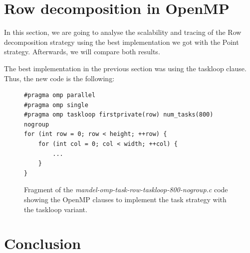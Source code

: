 \documentclass[12pt, a4paper]{article}
\begin{document}
\section{Row decomposition in OpenMP}

In this section, we are going to analyse the scalability and tracing of the Row decomposition strategy using the best implementation we got with the Point strategy. Afterwards, we will compare both results.

The best implementation in the previous section was using the taskloop clause. Thus, the new code is the following:

\begin{figure}
\begin{lstlisting}
#pragma omp parallel
#pragma omp single
#pragma omp taskloop firstprivate(row) num_tasks(800) nogroup
for (int row = 0; row < height; ++row) {
    for (int col = 0; col < width; ++col) {
        ...
	}
}
\end{lstlisting}
\caption{Fragment of the \textit{mandel-omp-task-row-taskloop-800-nogroup.c} code showing the OpenMP clauses to implement the task strategy with the taskloop variant.}
\label{code:task_implementation_row_taskloop_800}
\end{figure}


\section{Conclusion}
\end{document}
